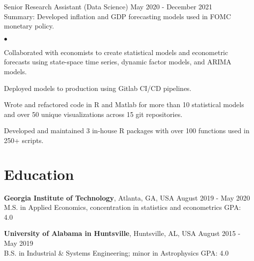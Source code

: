 \documentclass[margin, line]{res}
\newenvironment{list2}{
  \begin{list}{$\bullet$}{%
      \setlength{\itemsep}{0.04in}
      \setlength{\parsep}{0in} \setlength{\parskip}{0in}
      \setlength{\topsep}{0.05in} \setlength{\partopsep}{0in} 
      \setlength{\leftmargin}{\dimexpr 26pt-0.05in}}}
    {\end{list}}
\begin{document}
\begin{resume}
Senior Research Assistant (Data Science) \hfill May 2020 - December 2021 \\
\hspace*{3mm}
    Summary: Developed inflation and GDP forecasting models used in FOMC monetary policy.
    
    \begin{list2}
        \item Collaborated with economists to create statistical models and econometric forecasts using state-space time series, dynamic factor models, and ARIMA models.
        \item Deployed models to production using Gitlab CI/CD pipelines.
        \item Wrote and refactored code in R and Matlab for more than 10 statistical models and over 50 unique visualizations across 15 git repositories. 
        \item Developed and maintained 3 in-house R packages with over 100 functions used in 250+ scripts.
    \end{list2}


\section{\sc Education }

{\bf Georgia Institute of Technology}, Atlanta, GA, USA \hfill August 2019 - May 2020\\
M.S. in Applied Economics, concentration in statistics and econometrics \hfill GPA: 4.0


{\bf University of Alabama in Huntsville}, Huntsville, AL, USA \hfill August 2015 - May 2019 \\
B.S. in Industrial \& Systems Engineering; minor in Astrophysics \hfill GPA: 4.0

\end{resume}
\end{document}
